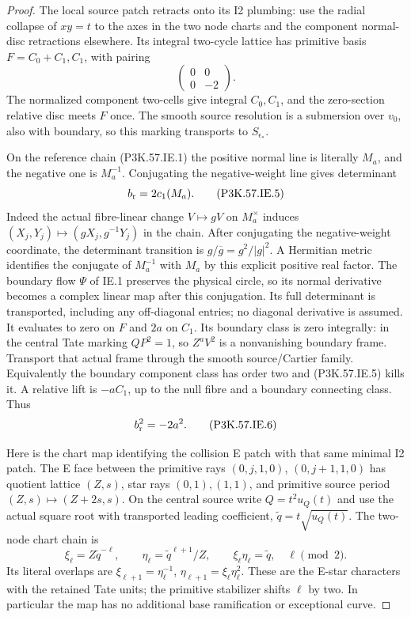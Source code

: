 \begin{proof}
The local source patch retracts onto its I2
plumbing: use the radial collapse of \(xy=t\)
to the axes in the two node charts and the
component normal-disc retractions elsewhere.
Its integral two-cycle lattice has primitive
basis \(F=C_0+C_1,C_1\), with pairing
\[
                  \begin{pmatrix}0&0\\0&-2\end{pmatrix}.       \tag{P3K.57.IE.4}
\]
The normalized component two-cells give integral
\(C_0,C_1\), and the zero-section relative disc
meets \(F\) once. The smooth source resolution
is a submersion over \(v_0\), also with boundary,
so this marking transports to \(S_{\epsilon_*}\).

On the reference chain (P3K.57.IE.1) the positive normal
line is literally \(M_a\), and the negative one
is \(M_a^{-1}\). Conjugating the negative-weight
line gives determinant
\[
                          b_{\rm r}=2c_1(M_a).          \tag{P3K.57.IE.5}
\]
Indeed the actual fibre-linear change \(V\mapsto gV\)
on \(M_a^\times\) induces
\((X_j,Y_j)\mapsto(gX_j,g^{-1}Y_j)\) in the chain.
After conjugating the negative-weight coordinate,
the determinant transition is
\(g/\overline g=g^2/|g|^2\). A Hermitian metric
identifies the conjugate of \(M_a^{-1}\) with
\(M_a\) by this explicit positive real factor.
The boundary flow \(\Psi\) of IE.1 preserves the
physical circle, so its normal derivative becomes
a complex linear map after this conjugation. Its
full determinant is transported, including any
off-diagonal entries; no diagonal derivative is
assumed.
It evaluates to zero on \(F\) and \(2a\) on \(C_1\).
Its boundary class is zero integrally: in the
central Tate marking \(QP^2=1\), so \(Z^aV^2\)
is a nonvanishing boundary frame. Transport that
actual frame through the smooth source/Cartier
family. Equivalently the boundary component class
has order two and (P3K.57.IE.5) kills it. A relative lift
is \(-aC_1\), up to the null fibre and a boundary
connecting class. Thus
\[
                              b_{\rm r}^2=-2a^2.        \tag{P3K.57.IE.6}
\]

Here is the chart map identifying the collision E
patch with that same minimal I2 patch. The E face
between the primitive rays
\((0,j,1,0)\), \((0,j+1,1,0)\) has quotient lattice
\((Z,s)\), star rays \((0,1),(1,1)\), and primitive
source period \((Z,s)\mapsto(Z+2s,s)\). On the central
source write \(Q=t^2u_Q(t)\) and use the actual
square root with transported leading coefficient,
\(\widetilde q=t\sqrt{u_Q(t)}\). The two-node chart
chain is
\[
 \xi_\ell=Z\widetilde q^{-\ell},\qquad
 \eta_\ell=\widetilde q^{\ell+1}/Z,\qquad
 \xi_\ell\eta_\ell=\widetilde q,
 \quad \ell\pmod2.                                  \tag{P3K.57.IE.5a}
\]
Its literal overlaps are
\(\xi_{\ell+1}=\eta_\ell^{-1}\),
\(\eta_{\ell+1}=\xi_\ell\eta_\ell^2\).
These are the E-star characters with the retained
Tate units; the primitive stabilizer shifts
\(\ell\) by two. In particular the map has no
additional base ramification or exceptional curve.


\end{proof}

